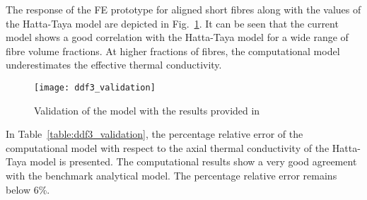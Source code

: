 	The response of the FE prototype for aligned short fibres along with the values of the Hatta-Taya model are depicted in Fig.~\ref{fig:ddf3_val}. It can be seen that the current model shows a good correlation with the Hatta-Taya model for a wide range of fibre volume fractions. At higher fractions of fibres, the computational model underestimates the effective thermal conductivity.
\begin{figure}[!h]{}
  \centering
\texttt{[image: ddf3\_validation]}
  \caption{Validation of the model with the results provided in~\autocite{Fu.2003,Choy.1994}}
  \label{fig:ddf3_val}
\end{figure}	
	
 	In Table~\ref{table:ddf3_validation}, the percentage relative error of the computational model with respect to the axial thermal conductivity of the Hatta-Taya model is presented. The computational results show a very good agreement with the benchmark analytical model. The percentage relative error remains below 6\%. 

